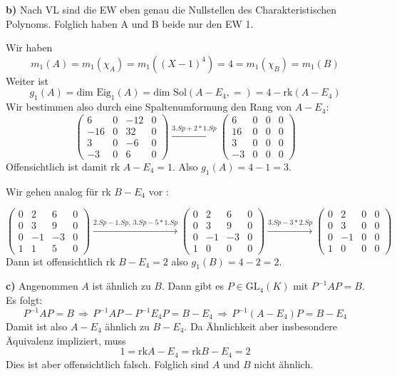 \documentclass[a4paper,graphics,11pt]{article}
\begin{document}
\textbf{b)}
Nach VL sind die EW eben genau die Nullstellen des Charakteristischen Polynoms.
Folglich haben A und B beide nur den EW 1.

Wir haben
$$
    m_1(A) = m_1(\chi_A) = m_1((X-1)^4) = 4 = m_1(\chi_B) = m_1(B)
$$
Weiter ist
$$
    g_1(A) = \text{dim Eig}_1(A) = \text{dim Sol}(A - E_4, =) = 4 - \text{rk}(A-E_4)
$$
Wir bestimmen also durch eine Spaltenumformung den Rang von $A-E_4 :$
$$
    \begin{pmatrix}
        6 & 0 & -12 & 0\\
        -16 & 0 & 32 & 0\\
        3 & 0 & -6 & 0\\
        -3 & 0 & 6 & 0
    \end{pmatrix}
    \xrightarrow {3.Sp + 2*1.Sp}
    \begin{pmatrix}
        6 & 0 & 0 & 0\\
        16 & 0 & 0 & 0\\
        3 & 0 & 0 & 0\\
        -3 & 0 & 0 & 0
    \end{pmatrix}
$$
Offensichtlich ist damit rk $A - E_4 = 1$. Also $g_1(A) = 4-1 = 3$.

\newpage

Wir gehen analog für rk $B-E_4$ vor :

$$
    \begin{pmatrix}
        0 & 2 & 6 & 0\\
        0 & 3 & 9 & 0\\
        0 & -1 & -3 & 0\\
        1 & 1 & 5 & 0
    \end{pmatrix}
    \xrightarrow {2.Sp - 1.Sp,\ 3.Sp - 5*1.Sp}
    \begin{pmatrix}
        0 & 2 & 6 & 0\\
        0 & 3 & 9 & 0\\
        0 & -1 & -3 & 0\\
        1 & 0 & 0 & 0
    \end{pmatrix}
    \xrightarrow {3.Sp - 3*2.Sp}
    \begin{pmatrix}
        0 & 2 & 0 & 0\\
        0 & 3 & 0 & 0\\
        0 & -1 & 0 & 0\\
        1 & 0 & 0 & 0
    \end{pmatrix}
$$
Dann ist offensichtlich rk $B-E_4 = 2$ also $g_1(B) = 4-2 = 2$.

\textbf{c)}
Angenommen $A$ ist ähnlich zu $B$. Dann gibt es $P \in \text{GL}_4(K)$ mit
$P^{-1}AP = B$.
Es folgt:
$$
    P^{-1}AP = B
    \,\Longrightarrow\, P^{-1}AP - P^{-1}E_4P = B - E_4
    \,\Longrightarrow\, P^{-1}(A-E_4)P = B-E_4
$$
Damit ist also $A-E_4$ ähnlich zu $B-E_4$. Da Ähnlichkeit aber insbesondere Äquivalenz
impliziert, muss
$$
    1 = \text{rk} A-E_4 = \text{rk} B-E_4 = 2
$$
Dies ist aber offensichtlich falsch. Folglich sind $A$ und $B$ nicht ähnlich.
\end{document}
